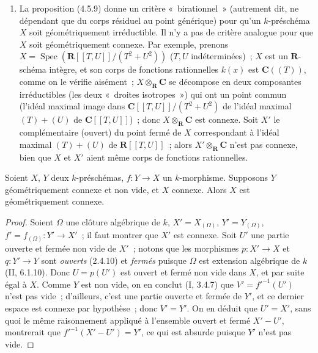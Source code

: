 \begin{remark}[4.5.12]
\begin{enumerate}
\item[(ii)] La proposition (4.5.9) donne un critère «~birationnel~» (autrement
dit, ne dépendant que du corps résiduel au point générique) pour qu'un
$k$-préschéma $X$ soit géométriquement irréductible. Il n'y a pas de critère
analogue pour que $X$ soit géométriquement connexe. Par exemple, prenons
$X=\operatorname{Spec}(\mathbf R[[T,U]]/(T^2+U^2))$ ($T,U$ indéterminées)~;
$X$ est un $\mathbf R$-schéma intègre, et son corps de fonctions rationnelles
$k(x)$ est $\mathbf C((T))$, comme on le vérifie aisément~; $X\otimes_{\mathbf
R}\mathbf C$ se décompose en deux composantes irréductibles (les deux
«~droites isotropes~») qui ont un point commun (l'idéal maximal image dans
$\mathbf C[[T,U]]/(T^2+U^2)$ de l'idéal maximal $(T)+(U)$ de
$\mathbf C[[T,U]]$)~; donc $X\otimes_{\mathbf R}\mathbf C$ est connexe. Soit
$X'$ le complémentaire (ouvert) du point fermé de $X$ correspondant à l'idéal
maximal $(T)+(U)$ de $\mathbf R[[T,U]]$~; alors $X'\otimes_{\mathbf R}\mathbf C$
n'est pas connexe, bien que $X$ et $X'$ aient même corps de fonctions
rationnelles.
\end{enumerate}
\end{remark}

\begin{proposition}[4.5.13]
\label{IV.2.4.5.13-fr}
Soient $X$, $Y$ deux $k$-préschémas, $f:Y\to X$ un $k$-morphisme. Supposons
$Y$ géométriquement connexe et non vide, et $X$ connexe. Alors $X$ est
géométriquement connexe.
\end{proposition}

\begin{proof}
Soient $\Omega$ une clôture algébrique de $k$, $X'=X_{(\Omega)}$,
$Y'=Y_{(\Omega)}$, $f'=f_{(\Omega)}:Y'\to X'$~; il faut montrer que $X'$ est
connexe. Soit $U'$ une partie ouverte et fermée non vide de $X'$~; notons que
les morphismes $p:X'\to X$ et $q:Y'\to Y$ sont \emph{ouverts} (2.4.10) et
\emph{fermés} puisque $\Omega$ est extension algébrique de $k$ (II, 6.1.10).
Donc $U=p(U')$ est ouvert et fermé non vide dans $X$, et par suite égal à $X$.
Comme $Y$ est non vide, on en conclut (I, 3.4.7) que
$V'=f'^{-1}(U')$ n'est pas vide~; d'ailleurs, c'est une partie ouverte et
fermée de $Y'$, et ce dernier espace est connexe par hypothèse~; donc $V'=Y'$.
On en déduit que $U'=X'$, sans quoi le même raisonnement appliqué à l'ensemble
ouvert et fermé $X'-U'$, montrerait que $f'^{-1}(X'-U')=Y'$, ce qui est absurde
puisque $Y'$ n'est pas vide.
\end{proof}

